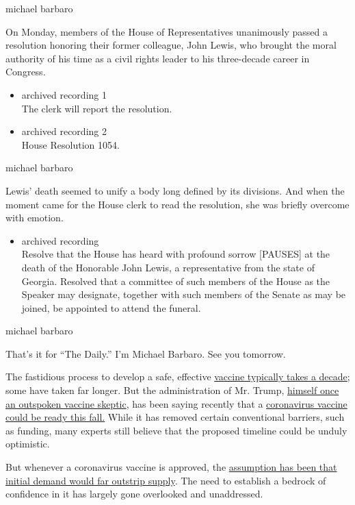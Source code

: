 michael barbaro

On Monday, members of the House of Representatives unanimously passed a
resolution honoring their former colleague, John Lewis, who brought the
moral authority of his time as a civil rights leader to his three-decade
career in Congress.

\begin{itemize}
\item
  archived recording 1\\
  The clerk will report the resolution.
\item
  archived recording 2\\
  House Resolution 1054.
\end{itemize}

michael barbaro

Lewis' death seemed to unify a body long defined by its divisions. And
when the moment came for the House clerk to read the resolution, she was
briefly overcome with emotion.

\begin{itemize}
\tightlist
\item
  archived recording\\
  Resolve that the House has heard with profound sorrow {[}PAUSES{]} at
  the death of the Honorable John Lewis, a representative from the state
  of Georgia. Resolved that a committee of such members of the House as
  the Speaker may designate, together with such members of the Senate as
  may be joined, be appointed to attend the funeral.
\end{itemize}

michael barbaro

That's it for ``The Daily.'' I'm Michael Barbaro. See you tomorrow.

The fastidious process to develop a safe, effective
\href{https://www.nytimes3xbfgragh.onion/interactive/2020/04/30/opinion/coronavirus-covid-vaccine.html}{vaccine
typically takes a decade}; some have taken far longer. But the
administration of Mr. Trump,
\href{https://www.nytimes3xbfgragh.onion/2020/03/09/health/trump-vaccines.html}{himself
once an outspoken vaccine skeptic}, has been saying recently that a
\href{https://www.businessinsider.com/trump-expects-covid-19-vaccine-fall-timeline-coronavirus-2020-7}{coronavirus
vaccine could be ready this fall.} While it has removed certain
conventional barriers, such as funding, many experts still believe that
the proposed timeline could be unduly optimistic.

But whenever a coronavirus vaccine is approved, the
\href{https://www.nytimes3xbfgragh.onion/2020/07/09/us/coronavirus-vaccine.html}{assumption
has been that initial demand would far outstrip supply}. The need to
establish a bedrock of confidence in it has largely gone overlooked and
unaddressed.

